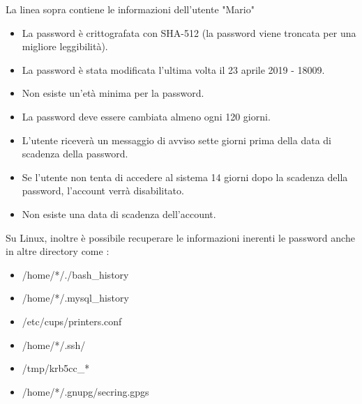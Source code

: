 La linea sopra contiene le informazioni dell'utente "Mario"

\begin{itemize}
    \item La password è crittografata con SHA-512 (la password viene troncata per una migliore leggibilità).
    \item La password è stata modificata l'ultima volta il 23 aprile 2019 - 18009.
    \item Non esiste un'età minima per la password.
    \item La password deve essere cambiata almeno ogni 120 giorni.
    \item L'utente riceverà un messaggio di avviso sette giorni prima della data di scadenza della password.
    \item Se l'utente non tenta di accedere al sistema 14 giorni dopo la scadenza della password, l'account verrà disabilitato.
    \item Non esiste una data di scadenza dell'account.
\end{itemize}

Su Linux, inoltre è possibile recuperare le informazioni inerenti le password anche in altre directory come :

\begin{itemize}
    \item /home/*/./bash\_history
    \item /home/*/.mysql\_history
    \item /etc/cups/printers.conf
    \item /home/*/.ssh/
    \item /tmp/krb5cc\_*
    \item /home/*/.gnupg/secring.gpgs
\end{itemize}